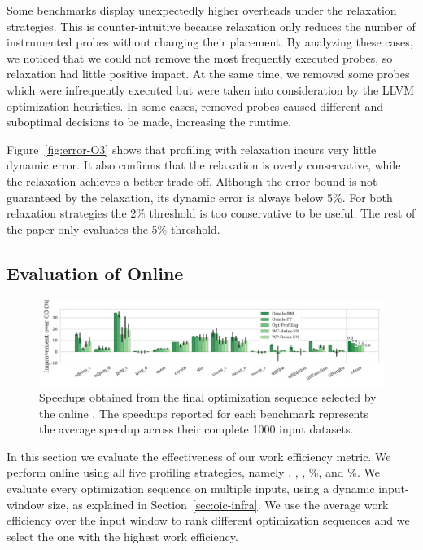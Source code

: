 Some benchmarks display unexpectedly higher overheads under the relaxation strategies. This is counter-intuitive because relaxation only
reduces the number of instrumented probes without changing their placement. By analyzing these cases, we noticed that we could not remove
the most frequently executed probes, so relaxation had little positive impact. At the same time, we removed some probes which were
infrequently executed but were taken into consideration by the LLVM optimization heuristics. In some cases, removed probes caused different
and suboptimal decisions to be made, increasing the runtime. 

Figure~\ref{fig:error-O3} shows that profiling with relaxation incurs very little dynamic error. It also confirms that the \WCRelaxLower
relaxation is overly conservative, while the \WPRelaxLower relaxation achieves a better trade-off. Although the error bound is not
guaranteed by the \WPRelaxLower relaxation, its dynamic error is always below 5\%. For both relaxation strategies the 2\% threshold is too
conservative to be useful. The rest of the paper only evaluates the 5\% threshold.

\subsection{Evaluation of Online {\IterComp}}

\begin{figure}[t]
    \centering
    \includegraphics[width=\textwidth]{figs/speedups.pdf}
    \caption{Speedups obtained from the final optimization sequence selected by the online {\itercomp}.
	         The speedups reported for each benchmark represents the average speedup across their complete 1000 input datasets.}

    \label{fig:speedups}
\end{figure}

In this section we evaluate the effectiveness of our work efficiency metric. We perform online {\itercomp} using all five profiling
strategies, namely \OracleRM, \OraclePP, \OptProf, \%, and \%. We evaluate every optimization sequence on multiple
inputs, using a dynamic input-window size, as explained in Section~\ref{sec:oic-infra}. We use the average work efficiency over the input
window to rank different optimization sequences and we select the one with the highest work efficiency.

